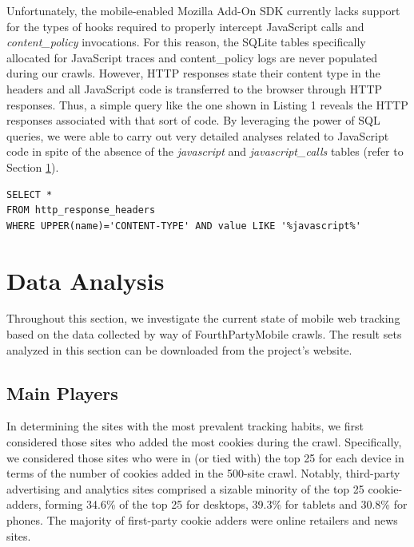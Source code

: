 \documentclass{acm_proc_article-sp}
\begin{document}
Unfortunately, the mobile-enabled Mozilla Add-On SDK currently lacks support for the types of hooks required to properly intercept JavaScript calls and \emph{content\_policy} invocations. For this reason, the SQLite tables specifically allocated for JavaScript traces and content\_policy logs are never populated during our crawls. However, HTTP responses state their content type in the headers and all JavaScript code is transferred to the browser through HTTP responses. Thus, a simple query like the one shown in Listing 1 reveals the HTTP responses associated with that sort of code. By leveraging the power of SQL queries, we were able to carry out very detailed analyses related to JavaScript code in spite of the absence of the \emph{javascript} and \emph{javascript\_calls} tables (refer to Section \ref{sec:analysis}).

\noindent\begin{minipage}{1.0\linewidth}\centering
\begin{lstlisting}[caption=Example JavaScript analysis based on HTTP Responses]
SELECT *
FROM http_response_headers
WHERE UPPER(name)='CONTENT-TYPE' AND value LIKE '%javascript%'
\end{lstlisting}
\end{minipage}

\section{Data Analysis}
\label{sec:analysis}

Throughout this section, we investigate the current state of mobile web tracking based on the data collected by way of FourthPartyMobile crawls. The result sets analyzed in this section can be downloaded from the project's website.

\subsection{Main Players}

In determining the sites with the most prevalent tracking habits, we first considered those sites who added the most cookies during the crawl. Specifically, we considered those sites who were in (or tied with) the top 25 for each device in terms of the number of cookies added in the 500-site crawl. Notably, third-party advertising and analytics sites comprised a sizable minority of the top 25 cookie-adders, forming 34.6\% of the top 25 for desktops, 39.3\% for tablets and 30.8\% for phones. The majority of first-party cookie adders were online retailers and news sites.
\end{document}
